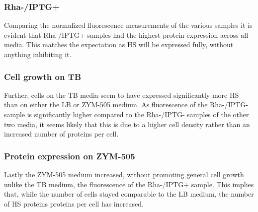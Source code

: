 \documentclass[a4paper]{scrreprt}
\begin{document}
\subsubsection{Rha-/IPTG+}

Comparing the normalized fluorescence measurements of the various samples it is
evident that Rha-/IPTG+ samples had the highest protein expression across all
media. This matches the expectation as HS will be expressed fully, without
anything inhibiting it.

\subsubsection{Cell growth on TB}

Further, cells on the TB media seem to have expressed significantly more HS
than on either the LB or ZYM-505 medium. As fluorescence of the Rha-/IPTG-
sample is significantly higher compared to the Rha-/IPTG- samples of the other
two media, it seems likely that this is due to a higher cell density rather
than an increased number of proteins per cell.

\subsubsection{Protein expression on ZYM-505}

Lastly the ZYM-505 medium increased, without promoting general cell growth
unlike the TB medium, the fluorescence of the Rha-/IPTG+ sample. This implies
that, while the number of cells stayed comparable to the LB medium, the number
of HS proteins proteins per cell has increased.



\end{document}
